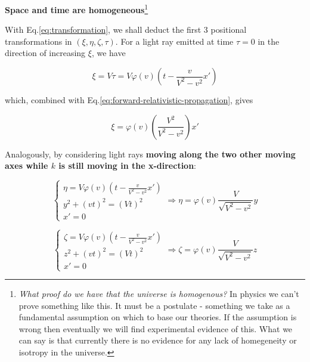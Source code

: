 \begin{tcolorbox}[
    enhanced,frame hidden,boxrule=0pt,interior style={top color=green!10!white,
    bottom color=green!10!white,middle color=green!50!yellow},
    fuzzy halo=1pt with green
]
    \begin{center}
        \textbf{Space and time are homogeneous}\footnote{\textit{What proof do we have that the universe is
        homogenous?} In physics we can't prove something like this. It must be a postulate - something we take as a
        fundamental assumption on which to base our theories. If the assumption is wrong then eventually we will find
        experimental evidence of this. What we can say is that currently there is no evidence for any lack of
        homegeneity or isotropy in the universe.}
    \end{center}
\end{tcolorbox}

With Eq.\ref{eq:transformation}, we shall deduct the first 3 positional transformations in $(\xi, \eta, \zeta, \tau)$.
For a light ray emitted at time $\tau = 0$ in the direction of increasing $\xi$, we have

\begin{equation}
    \xi = V\tau = V\varphi(v)\left( t - \frac{v}{V^2 - v^2} x' \right)
\end{equation}

which, combined with Eq.\ref{eq:forward-relativistic-propagation}, gives

\begin{equation}\label{eq:x-transformation}
    \xi = \varphi(v)\left( \frac{V^2}{V^2 - v^2} \right) x'
\end{equation}

Analogously, by considering light rays \textbf{moving along the two other moving axes while $k$ is still moving in the
x-direction}:

\begin{equation}\label{eq:y-transformation}
    \left\{
    \begin{array}{l}
        \eta = V\varphi(v)\left( t - \frac{v}{V^2 - v^2} x' \right) \\
        y^2 + (vt)^2 = (Vt)^2 \\
        x' = 0
    \end{array}
    \right.
    \Rightarrow
    \eta = \varphi(v)\frac{V}{\sqrt{V^2 - v^2}}y
\end{equation}

\begin{equation}\label{eq:z-transformation}
    \left\{
    \begin{array}{l}
        \zeta = V\varphi(v)\left( t - \frac{v}{V^2 - v^2} x' \right) \\
        z^2 + (vt)^2 = (Vt)^2 \\
        x' = 0
    \end{array}
    \right.
    \Rightarrow
    \zeta = \varphi(v)\frac{V}{\sqrt{V^2 - v^2}}z
\end{equation}

